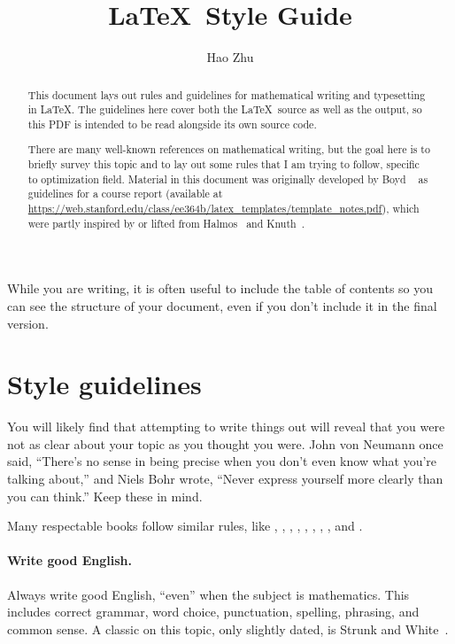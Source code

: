 \documentclass{article}
\title{\LaTeX\ Style Guide}
\author{Hao Zhu}
\affil{Department of Computer Science, University of Freiburg}
\begin{document}
\maketitle

\begin{abstract}
This document lays out rules and guidelines for mathematical writing and typesetting in \LaTeX. 
The guidelines here cover both the \LaTeX\ source as well as the output, so this PDF is intended to be read alongside its own source code.

There are many well-known references on mathematical writing, but the goal here is to briefly survey this topic and to lay out some rules that I am trying to follow, specific to optimization field. 
Material in this document was originally developed by Boyd \etal~\cite{boyd2014latex} as guidelines for a course report (available at \url{https://web.stanford.edu/class/ee364b/latex_templates/template_notes.pdf}), which were partly inspired by or lifted from Halmos~\cite{Halmos:1970} and Knuth~\cite{Knuth:1989}.
\end{abstract}

\newpage
\tableofcontents
\newpage

While you are writing, it is often useful to include the table of contents so you can see the structure of your document, even if you don't include it in the final version.

\section{Style guidelines}

You will likely find that attempting to write things out will reveal that you were not as clear about your topic as you thought you were. 
John von Neumann once said, ``There's no sense in being precise when you don't even know what you're talking about,'' and Niels Bohr wrote, ``Never express yourself more clearly than you can think.''
Keep these in mind.

Many respectable books follow similar rules, like
\cite{BoV:04},
\cite[p.~23]{Cover:1991},
\cite[p.~26]{Hastie:2001},
\cite[p.~21]{Sipser:2001},
\cite[p.~25]{Cormen:2001},
\cite[p.~15]{Rudin:1976},
\cite[p.~18]{Evans:2010},
\cite[p.~3]{Goldstein:1980}, and 
\cite{Knuth:1973}.

\paragraph{Write good English.}
Always write good English, ``even'' when the subject is mathematics. 
This includes correct grammar, word choice, punctuation, spelling, phrasing, and common sense. 
A classic on this topic, only slightly dated, is Strunk and White~\cite{SW:59}.
\end{document}
